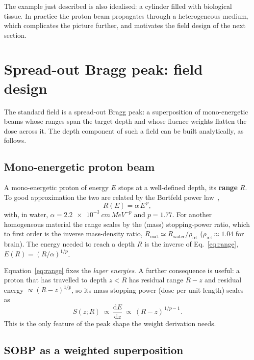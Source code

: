 \documentclass[11pt]{article}
\begin{document}
The example just described is also idealised: a cylinder filled with biological tissue. In practice the proton beam propagates through a heterogeneous medium, which complicates the picture further, and motivates the field design of the next section.

\section{Spread-out Bragg peak: field design}
\label{sec:sobp}

The standard field is a spread-out Bragg peak: a superposition of mono-energetic
beams whose ranges span the target depth and whose fluence weights flatten the
dose across it. The depth component of such a field can be built analytically, as
follows.

\subsection{Mono-energetic proton beam}
\label{sec:pristine}

A mono-energetic proton of energy $E$ stops at a well-defined depth, its
\textbf{range} $R$. To good approximation the two are related by the
Bortfeld power law~\cite{bortfeld1996},
\begin{equation}
R(E) = \alpha\,E^{\,p},
\label{eq:range}
\end{equation}
with, in water, $\alpha=\SI{2.2e-3}{cm\,MeV^{-p}}$ and $p=1.77$. For another
homogeneous material the range scales by the (mass) stopping-power ratio,
which to first order is the inverse mass-density ratio,
$R_{\mathrm{mat}}\simeq R_{\mathrm{water}}/\rho_{\mathrm{rel}}$
($\rho_{\mathrm{rel}}\approx1.04$ for brain). The energy needed to reach a depth
$R$ is the inverse of Eq.~\eqref{eq:range}, $E(R)=(R/\alpha)^{1/p}$.

Equation~\eqref{eq:range} fixes the \emph{layer energies}. A further consequence is
useful: a proton that has travelled to depth $z<R$ has residual range $R-z$ and
residual energy $\propto (R-z)^{1/p}$, so its mass stopping power (dose per unit
length) scales as
\begin{equation}
S(z;R)\ \propto\ \frac{\mathrm dE}{\mathrm dz}\ \propto\ (R-z)^{\,1/p-1}.
\label{eq:stop}
\end{equation}
This is the only feature of the peak shape the weight derivation needs.

\subsection{SOBP as a weighted superposition}
\label{sec:super}
\end{document}
